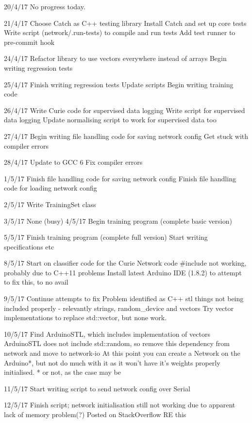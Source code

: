 \documentclass[a4paper]{article}
\begin{document}
20/4/17
    No progress today.

21/4/17
    Choose Catch as C++ testing library
    Install Catch and set up core tests
    Write script (network/.run-tests) to compile and run tests
    Add test runner to pre-commit hook

24/4/17
    Refactor library to use vectors everywhere instead of arrays
    Begin writing regression tests

25/4/17
    Finish writing regression tests
    Update scripts
    Begin writing training code

26/4/17
    Write Curie code for supervised data logging
    Write script for supervised data logging
    Update normalising script to work for supervised data too

27/4/17
    Begin writing file handling code for saving network config
    Get stuck with compiler errors

28/4/17
    Update to GCC 6
    Fix compiler errors

1/5/17
    Finish file handling code for saving network config
    Finish file handling code for loading network config

2/5/17
    Write TrainingSet class

3/5/17
    None (busy)
4/5/17
    Begin training program (complete basic version)

5/5/17
    Finish training program (complete full version)
    Start writing specifications etc

8/5/17
    Start on classifier code for the Curie
        Network code \#include not working, probably due to C++11 problems
    Install latest Arduino IDE (1.8.2) to attempt to fix this, to no avail

9/5/17
    Continue attempts to fix
    Problem identified as C++ stl things not being included properly - relevantly strings, random\_device and vectors
    Try vector implementations to replace std::vector, but none work.

10/5/17
    Find ArduinoSTL, which includes implementation of vectors
    ArduinoSTL does not include std::random, so remove this dependency from network and move to network-io
    At this point you can create a Network on the Arduino*, but not do much with it as it won't have it's weights properly initialised.
        * or not, as the case may be

11/5/17
    Start writing script to send network config over Serial

12/5/17
    Finish script; network initialisation still not working due to apparent lack of memory problem(?)
        Posted on StackOverflow RE this
\end{document}
